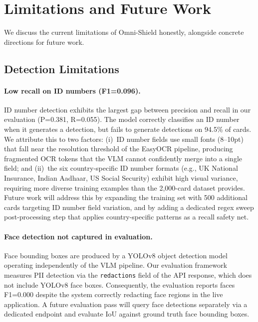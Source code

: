 \section{Limitations and Future Work}
\label{sec:limitations}
 
We discuss the current limitations of Omni-Shield
honestly, alongside concrete directions for future work.
 
\subsection{Detection Limitations}
 
\paragraph{Low recall on ID numbers (F1=0.096).}
ID number detection exhibits the largest gap between
precision and recall in our evaluation (P=0.381,
R=0.055).
The model correctly classifies an ID number when it
generates a detection, but fails to generate detections
on 94.5\% of cards.
We attribute this to two factors: (i)~ID number fields
use small fonts (8--10pt) that fall near the resolution
threshold of the EasyOCR pipeline, producing fragmented
OCR tokens that the VLM cannot confidently merge into a
single field; and (ii)~the six country-specific ID
number formats (e.g., UK National Insurance, Indian
Aadhaar, US Social Security) exhibit high visual
variance, requiring more diverse training examples than
the 2,000-card dataset provides.
Future work will address this by expanding the training
set with 500 additional cards targeting ID number field
variation, and by adding a dedicated regex sweep
post-processing step that applies country-specific
patterns as a recall safety net.
 
\paragraph{Face detection not captured in evaluation.}
Face bounding boxes are produced by a YOLOv8
object detection model operating independently of the
VLM pipeline.
Our evaluation framework measures PII detection via the
\texttt{redactions} field of the API response, which
does not include YOLOv8 face boxes.
Consequently, the evaluation reports faces F1=0.000
despite the system correctly redacting face regions
in the live application.
A future evaluation pass will query face detections
separately via a dedicated endpoint and evaluate IoU
against ground truth face bounding boxes.
 
